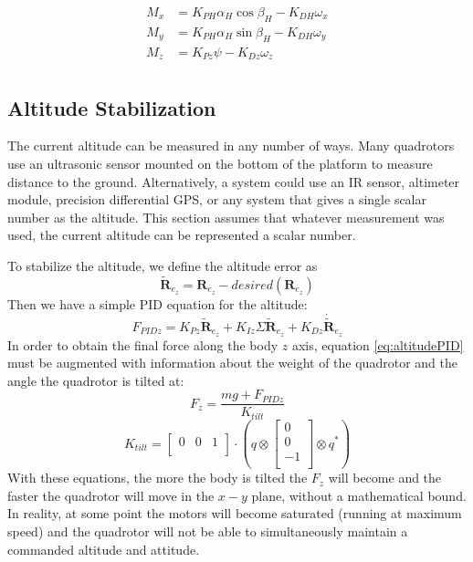 \documentclass{article}
\numberwithin{equation}{section} %
\newcommand{\bs}[1]{\boldsymbol{#1}}
\begin{document}
\begin{align}
	M_x &= K_{PH} \alpha_H \cos \beta_H - K_{DH} \omega_x \\
	M_y &= K_{PH} \alpha_H \sin \beta_H - K_{DH} \omega_y \\
	M_z &= K_{Pz} \psi - K_{Dz} \omega_z \\
\end{align}



\subsection{Altitude Stabilization} \label{subsec:altitudestabilization}
The current altitude can be measured in any number of ways. Many quadrotors use an ultrasonic sensor mounted on the bottom of the platform to measure distance to the ground. Alternatively, a system could use an IR sensor, altimeter module, precision differential GPS, or any system that gives a single scalar number as the altitude. This section assumes that whatever measurement was used, the current altitude can be represented a scalar number.

To stabilize the altitude, we define the altitude error as
\begin{equation}
\tilde{\bs{R}}_{e_z} = \bs{R}_{e_z} - desired \left( \bs{R}_{e_z} \right)
\end{equation}
Then we have a simple PID equation for the altitude:
\begin{equation} \label{eq:altitudePID}
	F_{PIDz} = K_{Pz} \tilde{\bs{R}}_{e_z} + K_{Iz} \Sigma \tilde{\bs{R}}_{e_z} + K_{Dz} \dot{\tilde{\bs{R}}}_{e_z}
\end{equation}
In order to obtain the final force along the body $z$ axis, equation \eqref{eq:altitudePID} must be augmented with information about the weight of the quadrotor and the angle the quadrotor is tilted at:
\begin{equation}
	F_z = \frac{mg + F_{PIDz}} {K_{tilt}}
\end{equation}
\begin{equation}
	K_{tilt} = 
	\begin{bmatrix}
		0 & 0 & 1 \\	
	\end{bmatrix}
	\cdot
	\left(
		q \otimes
			\begin{bmatrix}
				0 \\
				0 \\
				-1 \\
			\end{bmatrix}
		\otimes q^*
	\right)
\end{equation}
With these equations, the more the body is tilted the $F_z$ will become and the faster the quadrotor will move in the $x-y$ plane, without a mathematical bound. In reality, at some point the motors will become saturated (running at maximum speed) and the quadrotor will not be able to simultaneously maintain a commanded altitude and attitude.
\end{document}
